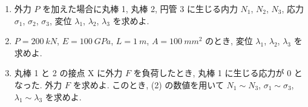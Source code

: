 \begin{enumerate}[label=(\arabic*)]
  \item 外力 $P$ を加えた場合に丸棒 1, 丸棒 2, 円管 3 に生じる内力 $N_1$, $N_2$, $N_3$,
        応力 $\sigma_1$, $\sigma_2$, $\sigma_3$, 変位 $\lambda_1$, $\lambda_2$, $\lambda_3$ を求めよ.

  \item $P=\SI{200}{kN}$, $E=\SI{100}{GPa}$, $L=\SI{1}{m}$, $A=\SI{100}{mm^2}$ のとき,
        変位 $\lambda_1$, $\lambda_2$, $\lambda_3$ を求めよ.

  \item 丸棒 1 と 2 の接点 X に外力 $F$ を負荷したとき, 丸棒 1 に生じる応力が 0 となった.
        外力 $F$ を求めよ. このとき, (2) の数値を用いて $N_1\!\sim\!N_3$, $\sigma_1\!\sim\!\sigma_3$,
        $\lambda_1\!\sim\!\lambda_3$ を求めよ.
\end{enumerate}
